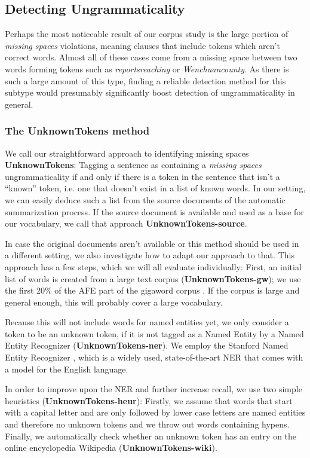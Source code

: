\documentclass[a4paper,10pt]{scrartcl}
\theoremstyle{style}
\begin{document}
\subsection{Detecting Ungrammaticality}
\label{sec_unknowntokens}
Perhaps the most noticeable result of our corpus study is the large portion of \textit{missing spaces} violations, meaning clauses that include tokens which aren't correct words. Almost all of these cases come from a missing space between two words forming tokens such as \textit{reportsreaching} or \textit{Wenchuancounty}. As there is such a large amount of this type, finding a reliable detection method for this subtype would presumably significantly boost detection of ungrammaticality in general.

\subsubsection{The UnknownTokens method}
We call our straightforward approach to identifying missing spaces \textbf{UnknownTokens}: Tagging a sentence as containing a \textit{missing spaces} ungrammaticality if and only if there is a token in the sentence that isn't a ``known'' token, i.e. one that doesn't exist in a list of known words. In our setting, we can easily deduce such a list from the source documents of the automatic summarization process. If the source document is available and used as a base for our vocabulary, we call that approach \textbf{UnknownTokens-source}.

In case the original documents aren't available or this method should be used in a different setting, we also investigate how to adapt our approach to that. This approach has a few steps, which we will all evaluate individually:
First, an initial list of words is created from a large text corpus (\textbf{UnknownTokens-gw}); we use the first 20\% of the AFE part of the gigaword corpus \citep{gigaword}. If the corpus is large and general enough, this will probably cover a large vocabulary.

Because this will not include words for named entities yet, we only consider a token to be an unknown token, if it is not tagged as a Named Entity by a Named Entity Recognizer (\textbf{UnknownTokens-ner}). We employ the Stanford Named Entity Recognizer \citep{stanfordNER}, which is a widely used, state-of-the-art NER that comes with a model for the English language.

In order to improve upon the NER and further increase recall, we use two simple heuristics (\textbf{UnknownTokens-heur}): Firstly, we assume that words that start with a capital letter and are only followed by lower case letters are named entities and therefore no unknown tokens and we throw out words containing hypens. Finally, we automatically check whether an unknown token has an entry on the online encyclopedia Wikipedia (\textbf{UnknownTokens-wiki}).
\end{document}
